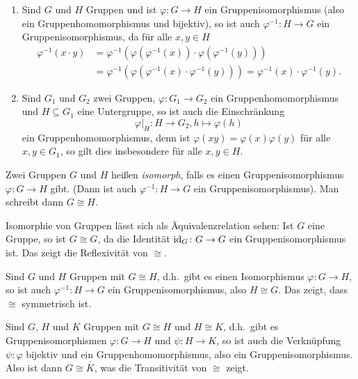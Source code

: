 \begin{bem}
\begin{enumerate}[leftmargin=*]
  \item
   Sind $G$ und $H$ Gruppen und ist $\varphi \colon G \to H$ ein Gruppenisomorphismus (also ein Gruppenhomomorphismus und bijektiv), so ist auch $\varphi^{-1} \colon H \to G$ ein Gruppenisomorphismus, da für alle $x,y \in H$
   \begin{align*}
    \varphi^{-1}(x \cdot y)
    &= \varphi^{-1}( \varphi(\varphi^{-1}(x)) \cdot \varphi(\varphi^{-1}(y)) ) \\
    &= \varphi^{-1}( \varphi( \varphi^{-1}(x) \cdot \varphi^{-1}(y) ) )
    = \varphi^{-1}(x) \cdot \varphi^{-1}(y).
   \end{align*}
  \item
   Sind $G_1$ und $G_2$ zwei Gruppen, $\varphi \colon G_1 \to G_2$ ein Gruppenhomomorphismus und $H \subseteq G_1$ eine Untergruppe, so ist auch die Einschränkung
   \[
    \varphi|_{H} \colon H \to G_2, h \mapsto \varphi(h)
   \]
   ein Gruppenhomomorphismus, denn ist $\varphi(xy) = \varphi(x)\varphi(y)$ für alle $x,y \in G_1$, so gilt dies insbesondere für alle $x,y \in H$.
 \end{enumerate}
\end{bem}


\begin{defi}
 Zwei Gruppen $G$ und $H$ heißen \emph{isomorph}, falls es einen Gruppenisomorphismus $\varphi \colon G \to H$ gibt. (Dann ist auch $\varphi^{-1} \colon H \to G$ ein Gruppenisomorphismus). Man schreibt dann $G \cong H$.
\end{defi}


\begin{bem}\label{bem: groups being isomorphis is an equivalence relationship}
 Isomorphie von Gruppen lässt sich als Äquivalenzrelation sehen: Ist $G$ eine Gruppe, so ist $G \cong G$, da die Identität $\mathrm{id}_G \colon G \to G$ ein Gruppenisomorphismus ist. Das zeigt die Reflexivität von $\cong$.
 
 Sind $G$ und $H$ Gruppen mit $G \cong H$, d.h.\ gibt es einen Isomorphismus $\varphi \colon G \to H$, so ist auch $\varphi^{-1} \colon H \to G$ ein Gruppenisomorphismus, also $H \cong G$. Das zeigt, dass $\cong$ symmetrisch ist.
 
 Sind $G$, $H$ und $K$ Gruppen mit $G \cong H$ und $H \cong K$, d.h.\ gibt es Gruppenisomorphismen $\varphi \colon G \to H$ und $\psi \colon H \to K$, so ist auch die Verknüpfung $\psi \colon \varphi$ bijektiv und ein Gruppenhomomorphismus, also ein Gruppenisomorphismus. Also ist dann $G \cong K$, was die Transitivität von $\cong$ zeigt.
\end{bem}






